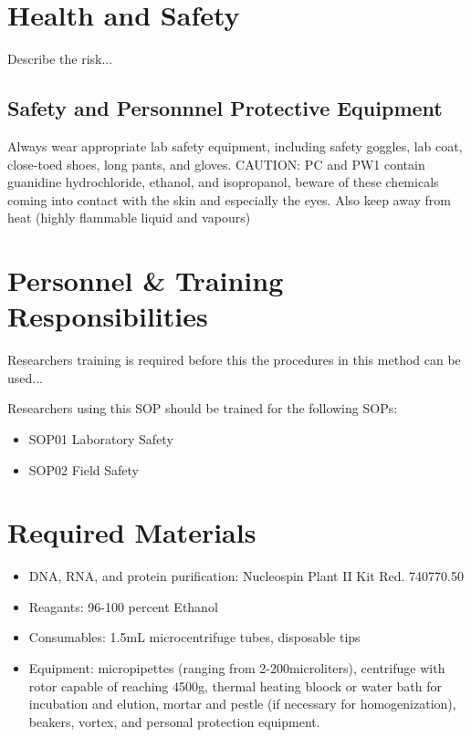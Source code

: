 \documentclass[12pt]{../SOP3_alpha}
\begin{document}
\section{Health and Safety}

\NP Describe the risk...


\subsection {Safety and Personnnel Protective Equipment}
Always wear appropriate lab safety equipment, including safety goggles, lab coat, close-toed shoes, long pants, and gloves. 
CAUTION: PC and PW1 contain guanidine hydrochloride, ethanol, and isopropanol, beware of these chemicals coming into contact with the skin and especially the eyes. Also keep away from heat (highly flammable liquid and vapours)


\section{Personnel \& Training Responsibilities}

\NP Researchers training is required before this the procedures in this method can be used... 

\NP Researchers using this SOP should be trained for the following SOPs:

\begin{itemize}
  \item SOP01 Laboratory Safety
  \item SOP02 Field Safety
\end{itemize}

\section{Required Materials}

\NP 
\begin{itemize}
  \item DNA, RNA, and protein purification: Nucleospin Plant II Kit Red. 740770.50
\end{itemize}


\NP \begin{itemize}
  \item Reagants: 96-100 percent Ethanol 
  \item Consumables: 1.5mL microcentrifuge tubes, disposable tips
  \item Equipment: micropipettes (ranging from 2-200microliters), centrifuge with rotor capable of reaching 4500g, thermal heating bloock or water bath for incubation and elution, mortar and pestle (if necessary for homogenization), beakers, vortex, and personal protection equipment.
\end{itemize}
\end{document}
